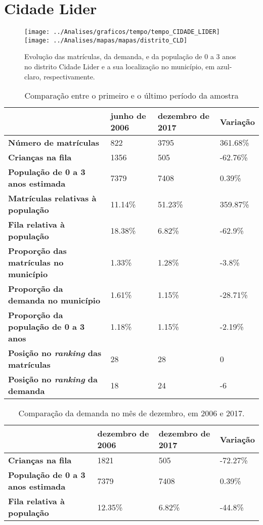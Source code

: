 \section{Cidade Lider}
\begin{figure}[H]
\centering
\texttt{[image: ../Analises/graficos/tempo/tempo\_CIDADE\_LIDER]}
\texttt{[image: ../Analises/mapas/mapas/distrito\_CLD]}
\caption{Evolução das matrículas, da demanda, e da população de 0 a 3 anos no distrito Cidade Lider e a sua localização no município, em azul-claro, respectivamente.}
\end{figure}
\begin{table}[H]
\begin{tabular}{l|l|l|l}
\textbf{}                                      & \textbf{junho de 2006}       & \textbf{dezembro de 2017}    & \textbf{Variação} \\ \hline
\textbf{Número de matrículas}                  & 822 & 3795 & 361.68\% \\ \hline
\textbf{Crianças na fila}                      & 1356 & 505 & -62.76\% \\ \hline
\textbf{População de 0 a 3 anos estimada}      & 7379 & 7408 & 0.39\% \\ \hline
\textbf{Matrículas relativas à população}      & 11.14\% & 51.23\% & 359.87\% \\ \hline
\textbf{Fila relativa à população}             & 18.38\% & 6.82\% & -62.9\% \\ \hline
\textbf{Proporção das matrículas no município} & 1.33\% & 1.28\% & -3.8\% \\ \hline
\textbf{Proporção da demanda no município}     & 1.61\% & 1.15\% & -28.71\% \\ \hline
\textbf{Proporção da população de 0 a 3 anos}  & 1.18\% & 1.15\% & -2.19\% \\ \hline
\textbf{Posição no \textit{ranking} das matrículas}     & 28 & 28 & 0 \\ \hline
\textbf{Posição no \textit{ranking} da demanda}         & 18 & 24 & -6 \\ 
\end{tabular}
\caption{Comparação entre o primeiro e o último período da amostra}
\end{table}
\begin{table}[H]
\begin{tabular}{l|l|l|l}
\textbf{}                                 & \textbf{dezembro de 2006} & \textbf{dezembro de 2017} & \textbf{Variação} \\ \hline
\textbf{Crianças na fila}                      & 1821 & 505 & -72.27\% \\ \hline
\textbf{População de 0 a 3 anos estimada}      & 7379 & 7408 & 0.39\% \\ \hline
\textbf{Fila relativa à população}             & 12.35\% & 6.82\% & -44.8\% \\
\end{tabular}
\caption{Comparação da demanda no mês de dezembro, em 2006 e 2017.}
\end{table}
